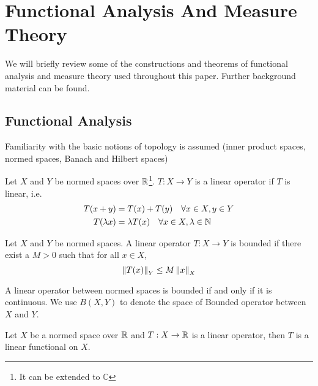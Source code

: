 \chapter{Functional Analysis And Measure Theory}
\label{app:function_measure}

We will briefly review some of the constructions and theorems of functional
analysis and measure theory used throughout this paper. Further background
material can be found.

\section{Functional Analysis}

Familiarity with the basic notions of topology is assumed (inner product
spaces, normed spaces, Banach and Hilbert spaces)



\begin{definition}
   Let $X$ and $Y$ be normed spaces over $\mathbb{R}$\footnote{
       It can be extended to $\mathbb{C}$
   }. $T: X \to Y$ is a linear operator if $T$ is linear, i.e.
   \begin{align*}
      T(x+y)       &= T(x) + T(y) \quad \forall x \in X, y \in Y \\
      T(\lambda x) &= \lambda T(x) \quad \forall x \in X, \lambda \in \mathbb{N}
   \end{align*}
\end{definition}

\begin{definition}
   Let $X$ and $Y$ be normed spaces. A linear operator $T: X \to Y$ is bounded
   if there exist a $M > 0$ such that for all $x \in X$,
   \begin{equation*}
      \left\| T(x) \right\|_{Y} \leq M \left\| x \right\|_{X}
   \end{equation*}
\end{definition}

A linear operator between normed spaces is bounded if and only if it is
continuous. We use $B(X, Y)$ to denote the space of Bounded operator between $X$
and $Y$.

\begin{definition}
   Let $X$ be a normed space over $\mathbb{R}$ and $T: X \to \mathbb{R}$ is a linear operator,
   then $T$ is a linear functional on $X$.
\end{definition}

